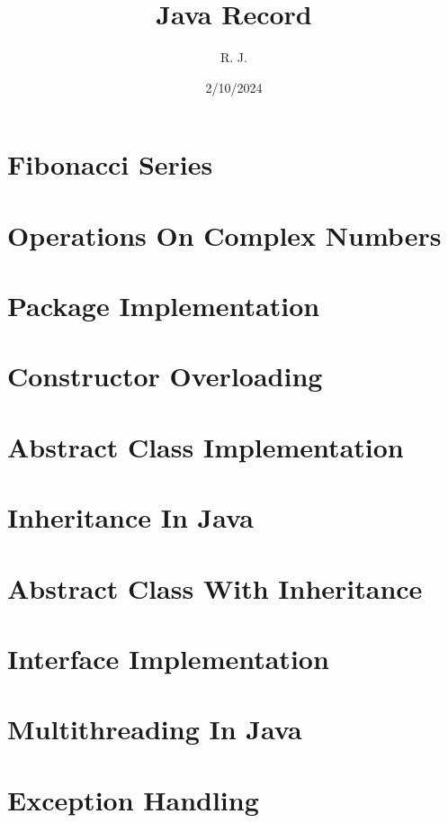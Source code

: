 \documentclass{article}
\title{Java Record}
\author{R. J.}
\date{2/10/2024}
\begin{document}

\newpage

\tableofcontents
\newpage

\section{Fibonacci Series}

\newpage

\section{Operations On Complex Numbers}

\newpage

\section{Package Implementation}

\newpage

\section{Constructor Overloading}

\newpage

\section{Abstract Class Implementation}

\newpage

\section{Inheritance In Java}


\section{Abstract Class With Inheritance}

\newpage

\section{Interface Implementation}

\newpage

\section{Multithreading In Java}

\newpage

\section{Exception Handling}

\newpage
\end{document}

